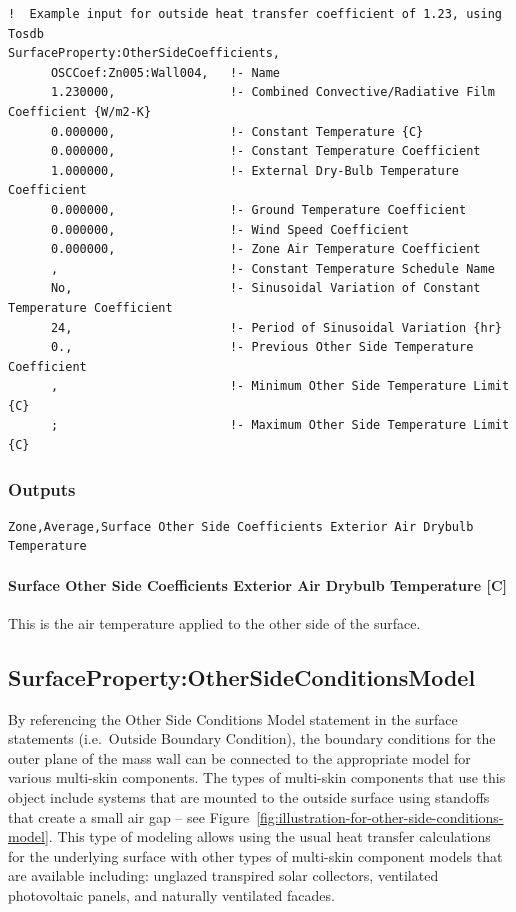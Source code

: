 \begin{lstlisting}
!  Example input for outside heat transfer coefficient of 1.23, using Tosdb
SurfaceProperty:OtherSideCoefficients,
      OSCCoef:Zn005:Wall004,   !- Name
      1.230000,                !- Combined Convective/Radiative Film Coefficient {W/m2-K}
      0.000000,                !- Constant Temperature {C}
      0.000000,                !- Constant Temperature Coefficient
      1.000000,                !- External Dry-Bulb Temperature Coefficient
      0.000000,                !- Ground Temperature Coefficient
      0.000000,                !- Wind Speed Coefficient
      0.000000,                !- Zone Air Temperature Coefficient
      ,                        !- Constant Temperature Schedule Name
      No,                      !- Sinusoidal Variation of Constant Temperature Coefficient
      24,                      !- Period of Sinusoidal Variation {hr}
      0.,                      !- Previous Other Side Temperature Coefficient
      ,                        !- Minimum Other Side Temperature Limit {C}
      ;                        !- Maximum Other Side Temperature Limit {C}
\end{lstlisting}

\subsubsection{Outputs}\label{outputs}

\begin{lstlisting}
Zone,Average,Surface Other Side Coefficients Exterior Air Drybulb Temperature
\end{lstlisting}

\paragraph{Surface Other Side Coefficients Exterior Air Drybulb Temperature {[}C{]}}\label{surface-other-side-coefficients-exterior-air-drybulb-temperature-c}

This is the air temperature applied to the other side of the surface.

\subsection{SurfaceProperty:OtherSideConditionsModel}\label{surfacepropertyothersideconditionsmodel}

By referencing the Other Side Conditions Model statement in the surface statements (i.e.~Outside Boundary Condition), the boundary conditions for the outer plane of the mass wall can be connected to the appropriate model for various multi-skin components. The types of multi-skin components that use this object include systems that are mounted to the outside surface using standoffs that create a small air gap -- see Figure~\ref{fig:illustration-for-other-side-conditions-model}. This type of modeling allows using the usual heat transfer calculations for the underlying surface with other types of multi-skin component models that are available including: unglazed transpired solar collectors, ventilated photovoltaic panels, and naturally ventilated facades.

